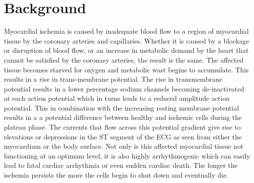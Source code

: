 \documentclass[12pt]{article}
\begin{document}
\section{Background}

Myocardial ischemia is caused by inadequate blood flow to a region of myocardial tissue by the coronary arteries and capillaries. Whether it is caused by a blockage or disruption of blood flow, or an increase in metabolic demand by the heart that cannot be satisfied by the coronary arteries, the result is the same. The affected tissue becomes starved for oxygen and metabolic wast begins to accumulate. This results in a rise in trans-membrane potential. The rise in transmembrane potential results in a lower percentage sodium channels becoming de-inactivated at each action potential which in turns leads to a reduced amplitude action potential. This in combination with the increasing resting membrane potential results in a a potential difference between healthy and ischemic cells during the plateau phase. The currents that flow across this potential gradient give rise to elevations or depressions in the ST segment of the ECG as seen from either the myocardium or the body surface. \cite{RSM:Hea94,RSM:Jan80} Not only is this affected myocardial tissue not functioning at an optimum level, it is also highly arrhythmogenic which can easily lead to fatal cardiac arrhythmia or even sudden cardiac death.\cite{RSM:Jan80,Zipes98} The longer the ischemia persists the more the cells begin to shut down and eventually die.
\end{document}
